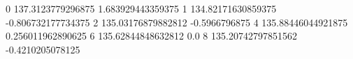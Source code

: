 0 137.3123779296875 1.683929443359375
1 134.82171630859375 -0.806732177734375
2 135.03176879882812 -0.5966796875
4 135.88446044921875 0.256011962890625
6 135.62844848632812 0.0
8 135.20742797851562 -0.4210205078125
